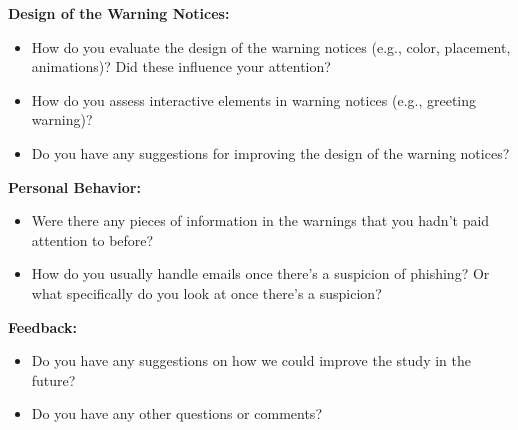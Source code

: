 \documentclass[
  a4paper,  %
  twoside,  %
  bibliography=totoc,
  headsepline,
  cleardoublepage=empty,
  parskip=half,
  draft=false
]{scrbook}
\begin{document}
\textbf{Design of the Warning Notices:}

    \begin{itemize}
        \item How do you evaluate the design of the warning notices (e.g., color, placement, animations)? Did these influence your attention?
        \item How do you assess interactive elements in warning notices (e.g., greeting warning)?
        \item Do you have any suggestions for improving the design of the warning notices?
    \end{itemize}

\textbf{Personal Behavior:
}
    \begin{itemize}
        \item Were there any pieces of information in the warnings that you hadn't paid attention to before?
        \item How do you usually handle emails once there's a suspicion of phishing? Or what specifically do you look at once there's a suspicion?
    \end{itemize}

\textbf{Feedback:
}
    \begin{itemize}
        \item Do you have any suggestions on how we could improve the study in the future?
        \item Do you have any other questions or comments?
    \end{itemize}

\newpage   
\end{document}
